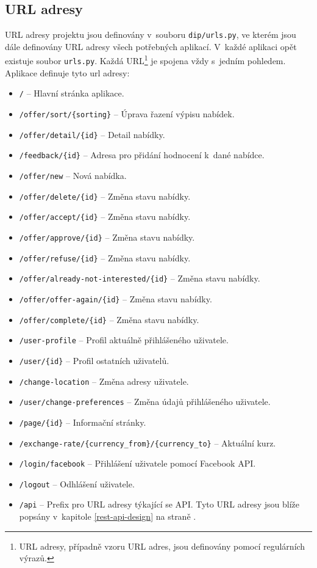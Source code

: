 \subsection{URL adresy}
URL adresy projektu jsou definovány v~souboru \texttt{dip/urls.py}, ve kterém jsou dále definovány URL adresy všech potřebných aplikací. V~každé aplikaci opět existuje soubor \texttt{urls.py}. Každá URL\footnote{URL adresy, případně vzoru URL adres, jsou definovány pomocí regulárních výrazů.} je spojena vždy s~jedním pohledem. Aplikace definuje tyto url adresy:
\begin{itemize}
    \item \texttt{/} -- Hlavní stránka aplikace.
    \item \texttt{/offer/sort/\{sorting\}} -- Úprava řazení výpisu nabídek.
    \item \texttt{/offer/detail/\{id\}} -- Detail nabídky.
    \item \texttt{/feedback/\{id\}} -- Adresa pro přidání hodnocení k~dané nabídce.
    \item \texttt{/offer/new} -- Nová nabídka.
    \item \texttt{/offer/delete/\{id\}} -- Změna stavu nabídky.
    \item \texttt{/offer/accept/\{id\}} -- Změna stavu nabídky.
    \item \texttt{/offer/approve/\{id\}} -- Změna stavu nabídky.
    \item \texttt{/offer/refuse/\{id\}} -- Změna stavu nabídky.
    \item \texttt{/offer/already-not-interested/\{id\}} -- Změna stavu nabídky.
    \item \texttt{/offer/offer-again/\{id\}} -- Změna stavu nabídky.
    \item \texttt{/offer/complete/\{id\}} -- Změna stavu nabídky.
    \item \texttt{/user-profile} -- Profil aktuálně přihlášeného uživatele.
    \item \texttt{/user/\{id\}} -- Profil ostatních uživatelů.
    \item \texttt{/change-location} -- Změna adresy uživatele.
    \item \texttt{/user/change-preferences} -- Změna údajů přihlášeného uživatele.
    \item \texttt{/page/\{id\}} -- Informační stránky.
    \item \texttt{/exchange-rate/\{currency\_from\}/\{currency\_to\}} -- Aktuální kurz.
    \item \texttt{/login/facebook} -- Přihlášení uživatele pomocí Facebook API.
    \item \texttt{/logout} -- Odhlášení uživatele.
    \item \texttt{/api} -- Prefix pro URL adresy týkající se API. Tyto URL adresy jsou blíže popsány v~kapitole \ref{rest-api-design} na straně \pageref{rest-api-design}.
\end{itemize}

